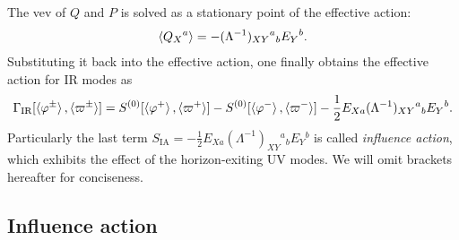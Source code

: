 \documentclass[aps, prd
, preprint
, nofootinbib 
]{revtex4-1}
\newcommand{\IR}{\text{IR}}
\newcommand{\SIA}{S_\text{IA}}
\newcommand{\bae}[1]{\begin{align} #1 \end{align}}
\begin{document}
The vev of $Q$ and $P$ is solved as a stationary point of the effective action:
\bae{
	\braket{Q_X{}^a}=-(\Lambda^{-1})_{XY}{}^a{}_bE_Y{}^b.
}
Substituting it back into the effective action, one finally obtains the effective action for IR modes as
\bae{
	\Gamma_\IR[\braket{\varphi^\pm},\braket{\varpi^\pm}]=S^{(0)}[\braket{\varphi^+},\braket{\varpi^+}]
	-S^{(0)}[\braket{\varphi^-},\braket{\varpi^-}]-\frac{1}{2}E_{Xa}(\Lambda^{-1})_{XY}{}^a{}_bE_Y{}^b.
}
Particularly the last term $\SIA=-\frac{1}{2}E_{Xa}(\Lambda^{-1})_{XY}{}^a{}_bE_Y{}^b$ is called \emph{influence action}, which
exhibits the effect of the horizon-exiting UV modes. We will omit brackets hereafter for conciseness.




\subsection{Influence action}
\end{document}
